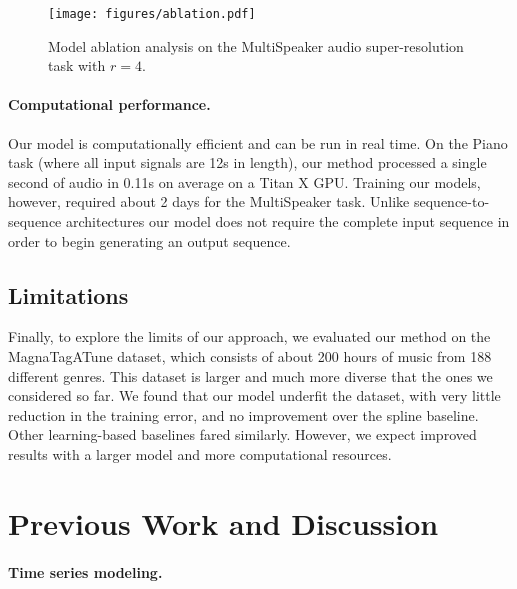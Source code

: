 \documentclass{article} \usepackage{iclr2017_workshop,times}
\begin{document}
\begin{wrapfigure}{r}{0.53\textwidth}
\label{fig:curves}
\vspace{-5mm}
\texttt{[image: figures/ablation.pdf]}
\vspace{-7mm}
\begin{small}
\caption{Model ablation analysis on the MultiSpeaker audio super-resolution task with $r=4$.
}\end{small}
\end{wrapfigure}





\paragraph{Computational performance.}

Our model is computationally efficient and can be run in real time. 
On the {\sc Piano} task (where all input signals are 12s in length), our method processed a single second of audio in 0.11s on average on a Titan X GPU. Training our models, however, required about 2 days for the {\sc MultiSpeaker} task.
Unlike sequence-to-sequence architectures our model does not require the complete input sequence in order to begin generating an output sequence.

\subsection{Limitations}

Finally, to explore the limits of our approach, we evaluated our method on the MagnaTagATune dataset, which consists of about 200 hours of music from 188 different genres. This dataset is larger and much more diverse that the ones we considered so far. We found that our model underfit the dataset, with very little reduction in the training error, and no improvement over the spline baseline. Other learning-based baselines fared similarly. However, we expect improved results with a larger model and more computational resources.

\section{Previous Work and Discussion}

\paragraph{Time series modeling.}
\end{document}
